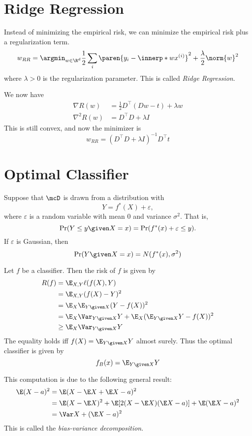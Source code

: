 \section{Ridge Regression} \label{sec:regression:ridge}
Instead of minimizing the empirical risk, we can minimize the empirical risk
plus a regularization term.
\[
    w_{RR} = \argmin_{w \in \R^d}
                \frac12 \sum_i \paren{y_i - \innerp* w {x^{(i)}}}^2
                + \frac{\lambda}{2} \norm{w}^2
\] where $\lambda > 0$ is the regularization parameter.
This is called \emph{Ridge Regression}.

We now have \begin{align*}
    \nabla R(w) &= \frac12 D^\top (Dw - t) + \lambda w \\
    \nabla^2 R(w) &= D^\top D + \lambda I
\end{align*}
This is still convex, and now the minimizer is \[
    \boxed{w_{RR} = (D^\top D + \lambda I)^{-1} D^\top t}
\]

\section{Optimal Classifier} \label{sec:regression:optimal}
Suppose that $\mcD$ is drawn from a distribution with \[
    Y = f^*(X) + \varepsilon,
\] where $\varepsilon$ is a random variable with mean $0$ and variance
$\sigma^2$.
That is, \[
    \Pr(Y \le y \given X = x) = \Pr(f^*(x) + \varepsilon \le y).
\] If $\varepsilon$ is Gaussian, then \[
    \Pr(Y \given X = x) = N(f^*(x), \sigma^2)
\]

Let $f$ be a classifier.
Then the risk of $f$ is given by \begin{align*}
    R(f) &= \E_{X, Y} \ell(f(X), Y) \\
    &= \E_{X, Y} (f(X) - Y)^2 \\
    &= \E_X \E_{Y \given X} (Y - f(X))^2 \\
    &= \E_X \Var_{Y \given X} Y + \E_X (\E_{Y \given X} Y - f(X))^2 \\
    &\ge \E_X \Var_{Y \given X} Y
\end{align*}
The equality holds iff $f(X) = \E_{Y \given X} Y$ almost surely.
Thus the optimal classifier is given by \[
    f_B(x) = \E_{Y \given X} Y
\]

This computation is due to the following general result: \begin{align}
    \E (X - a)^2 &= \E (X - \E X + \E X - a)^2 \nonumber \\
    &= \E (X - \E X)^2 + \E [2(X - \E X)(\E X - a)] + \E (\E X - a)^2 \nonumber \\
    &= \Var X + (\E X - a)^2 \label{eq:bias-variance}
\end{align}
This is called the \emph{bias-variance decomposition}.

